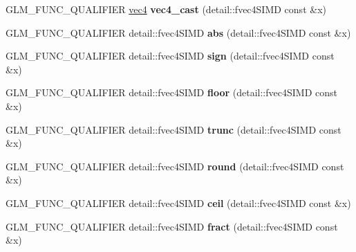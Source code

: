 \begin{DoxyCompactItemize}
\item 
G\+L\+M\+\_\+\+F\+U\+N\+C\+\_\+\+Q\+U\+A\+L\+I\+F\+I\+ER \hyperlink{group__core__types_ga5881b1b022d7fd1b7218f5916532dd02}{vec4} {\bfseries vec4\+\_\+cast} (detail\+::fvec4\+S\+I\+MD const \&x)\hypertarget{namespaceglm_a8fd3f484b1badc1724ab65dc9714ad6c}{}\label{namespaceglm_a8fd3f484b1badc1724ab65dc9714ad6c}

\item 
G\+L\+M\+\_\+\+F\+U\+N\+C\+\_\+\+Q\+U\+A\+L\+I\+F\+I\+ER detail\+::fvec4\+S\+I\+MD {\bfseries abs} (detail\+::fvec4\+S\+I\+MD const \&x)\hypertarget{namespaceglm_a68109cc8f5b3e44fd65707fac87fb4d5}{}\label{namespaceglm_a68109cc8f5b3e44fd65707fac87fb4d5}

\item 
G\+L\+M\+\_\+\+F\+U\+N\+C\+\_\+\+Q\+U\+A\+L\+I\+F\+I\+ER detail\+::fvec4\+S\+I\+MD {\bfseries sign} (detail\+::fvec4\+S\+I\+MD const \&x)\hypertarget{namespaceglm_af67d3ef2ca567fe890c09a8fa26328bf}{}\label{namespaceglm_af67d3ef2ca567fe890c09a8fa26328bf}

\item 
G\+L\+M\+\_\+\+F\+U\+N\+C\+\_\+\+Q\+U\+A\+L\+I\+F\+I\+ER detail\+::fvec4\+S\+I\+MD {\bfseries floor} (detail\+::fvec4\+S\+I\+MD const \&x)\hypertarget{namespaceglm_a96b854694bd3ae049376cbdba57f2599}{}\label{namespaceglm_a96b854694bd3ae049376cbdba57f2599}

\item 
G\+L\+M\+\_\+\+F\+U\+N\+C\+\_\+\+Q\+U\+A\+L\+I\+F\+I\+ER detail\+::fvec4\+S\+I\+MD {\bfseries trunc} (detail\+::fvec4\+S\+I\+MD const \&x)\hypertarget{namespaceglm_a9209720f29f7ce2e879af12191051927}{}\label{namespaceglm_a9209720f29f7ce2e879af12191051927}

\item 
G\+L\+M\+\_\+\+F\+U\+N\+C\+\_\+\+Q\+U\+A\+L\+I\+F\+I\+ER detail\+::fvec4\+S\+I\+MD {\bfseries round} (detail\+::fvec4\+S\+I\+MD const \&x)\hypertarget{namespaceglm_ac38130a4224e740980925150ea8dae5e}{}\label{namespaceglm_ac38130a4224e740980925150ea8dae5e}

\item 
G\+L\+M\+\_\+\+F\+U\+N\+C\+\_\+\+Q\+U\+A\+L\+I\+F\+I\+ER detail\+::fvec4\+S\+I\+MD {\bfseries ceil} (detail\+::fvec4\+S\+I\+MD const \&x)\hypertarget{namespaceglm_adc50f5413973998fb007fda7a6149ef5}{}\label{namespaceglm_adc50f5413973998fb007fda7a6149ef5}

\item 
G\+L\+M\+\_\+\+F\+U\+N\+C\+\_\+\+Q\+U\+A\+L\+I\+F\+I\+ER detail\+::fvec4\+S\+I\+MD {\bfseries fract} (detail\+::fvec4\+S\+I\+MD const \&x)\hypertarget{namespaceglm_a5a003d7f27903c03744ca6271f1a9051}{}\label{namespaceglm_a5a003d7f27903c03744ca6271f1a9051}


\end{DoxyCompactItemize}
